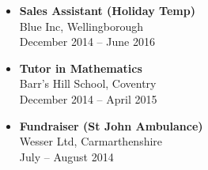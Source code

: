 \medskip


\begin{itemize}
	\item \textbf{Sales Assistant (Holiday Temp)} \\
	Blue Inc, Wellingborough \\
	December 2014 -- June 2016
	\item \textbf{Tutor in Mathematics} \\
	Barr's Hill School, Coventry \\
	December 2014 -- April 2015
	\item \textbf{Fundraiser (St John Ambulance)} \\
	Wesser Ltd, Carmarthenshire \\
	July -- August 2014
\end{itemize}
